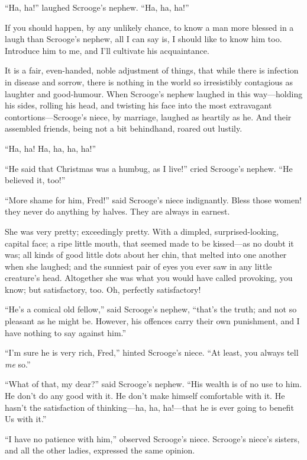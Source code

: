 \documentclass[paper=a5,BCOR=15mm,twoside,DIV=15,headinclude=off,12pt,chapterprefix=off,openany,headings=huge]{scrbook} %
\begin{document}
\enquote{Ha, ha!} laughed Scrooge's nephew. \enquote{Ha, ha, ha!}

If you should happen, by any unlikely chance, to know a man more blessed in a laugh than Scrooge's nephew, all I can say is, I should like to know him too. Introduce him to me, and I'll cultivate his acquaintance.

It is a fair, even-handed, noble adjustment of things, that while there is infection in disease and sorrow, there is nothing in the world so irresistibly contagious as laughter and good-humour. When Scrooge's nephew laughed in this way—holding his sides, rolling his head, and twisting his face into the most extravagant contortions—Scrooge's niece, by marriage, laughed as heartily as he. And their assembled friends, being not a bit behindhand, roared out lustily.

\enquote{Ha, ha! Ha, ha, ha, ha!}

\enquote{He said that Christmas was a humbug, as I live!} cried Scrooge's nephew. \enquote{He believed it, too!}

\enquote{More shame for him, Fred!} said Scrooge's niece indignantly. Bless those women! they never do anything by halves. They are always in earnest.

She was very pretty; exceedingly pretty. With a dimpled, surprised-looking, capital face; a ripe little mouth, that seemed made to be kissed—as no doubt it was; all kinds of good little dots about her chin, that melted into one another when she laughed; and the sunniest pair of eyes you ever saw in any little creature's head. Altogether she was what you would have called provoking, you know; but satisfactory, too. Oh, perfectly satisfactory!

\enquote{He's a comical old fellow,} said Scrooge's nephew, \enquote{that's the truth; and not so pleasant as he might be. However, his offences carry their own punishment, and I have nothing to say against him.}

\enquote{I'm sure he is very rich, Fred,} hinted Scrooge's niece. \enquote{At least, you always tell \textit{me} so.}

\enquote{What of that, my dear?} said Scrooge's nephew. \enquote{His wealth is of no use to him. He don't do any good with it. He don't make himself comfortable with it. He hasn't the satisfaction of thinking—ha, ha, ha!—that he is ever going to benefit Us with it.}

\enquote{I have no patience with him,} observed Scrooge's niece. Scrooge's niece's sisters, and all the other ladies, expressed the same opinion.
\end{document}
